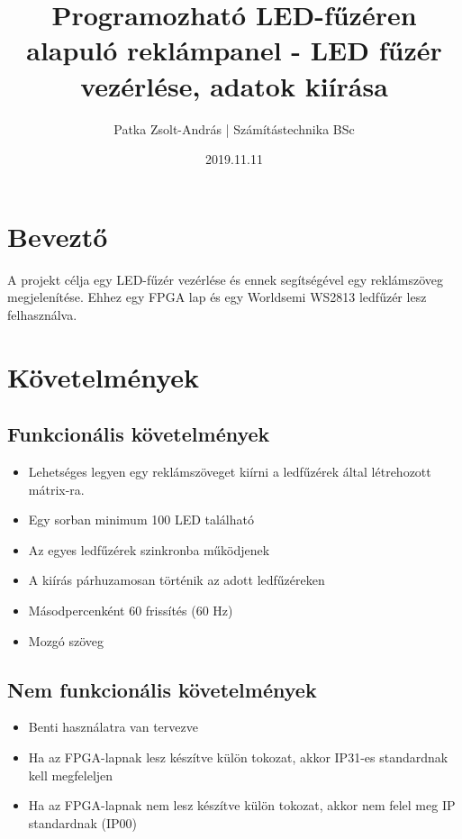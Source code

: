 \documentclass[10pt]{article} %
\title{Programozható LED-fűzéren alapuló reklámpanel - LED fűzér vezérlése, adatok kiírása}
\author{Patka Zsolt-András | Számítástechnika BSc}
\date{2019.11.11}
\begin{document}
\maketitle

\section{Beveztő}

A projekt célja egy LED-fűzér vezérlése és ennek segítségével egy reklámszöveg megjelenítése. Ehhez egy FPGA lap és egy Worldsemi WS2813 ledfűzér lesz felhasználva.

\section{Követelmények}

\subsection{Funkcionális követelmények}
\begin{itemize}
\item Lehetséges legyen egy reklámszöveget kiírni a ledfűzérek által létrehozott mátrix-ra.
\item Egy sorban minimum 100 LED található
\item Az egyes ledfűzérek szinkronba működjenek
\item A kiírás párhuzamosan történik az adott ledfűzéreken
\item Másodpercenként 60 frissítés (60 Hz)
\item Mozgó szöveg
\end{itemize}

\subsection{Nem funkcionális követelmények}
\begin{itemize}
\item Benti használatra van tervezve
\item Ha az FPGA-lapnak lesz készítve külön tokozat, akkor IP31-es standardnak kell megfeleljen
\item Ha az FPGA-lapnak nem lesz készítve külön tokozat, akkor nem felel meg IP standardnak (IP00)
\end{itemize}
\end{document}
